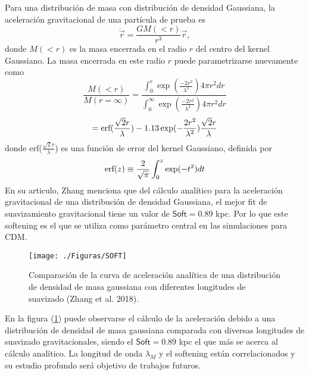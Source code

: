 \documentclass[a4paper,openright,12pt]{book}
\begin{document}
Para una distribución de masa con distribución de densidad Gaussiana, la aceleración gravitacional de una partícula de prueba es
\begin{equation}
\ddot{\vec{r}}= \frac{G M(<r)}{r^{3}}\vec{r},
\end{equation}
donde $M(<r)$ es la masa encerrada en el radio $r$ del centro del kernel Gaussiano. La masa encerrada en este radio $r$ puede parametrizarse nuevamente como
\begin{equation*}
\frac{M(<r)}{M(r=\infty)} = \frac{\int_{0}^{r}\exp(\frac{-2r^{2}}{\lambda^{2}})4\pi r^{2}dr}{\int_{0}^{\infty}\exp(\frac{-2r^{2}}{\lambda^{2}})4\pi r^{2}dr}
\end{equation*}
\begin{equation}
= \textup{erf}(\frac{\sqrt{2}r}{\lambda}) -1.13\exp(-\frac{2r^{2}}{\lambda^{2}})\frac{\sqrt{2}r}{\lambda}
\end{equation}
donde erf($\frac{\sqrt{2}r}{\lambda}$) es una función de error del kernel Gaussiano, definida por
\begin{equation*}
\textup{erf}(z) \equiv \frac{2}{\sqrt{\pi}}\int_{0}^{z}\exp(-t^{2})dt
\end{equation*}
En su articulo, Zhang menciona que del cálculo analítico para la aceleración gravitacional de una distribución de densidad Gaussiana, el mejor fit de suavizamiento gravitacional tiene un valor de $\textsf{Soft}=0.89$ kpc. Por lo que este softening es el que se utiliza como parámetro central en las simulaciones para CDM.


\begin{figure}
\centering
\texttt{[image: ./Figuras/SOFT]}
\caption{\footnotesize{Comparación de la curva de aceleración analítica de una distribución de densidad de masa gaussiana con diferentes longitudes de suavizado (Zhang et al. 2018).}}\label{fig 4.4}
\end{figure}

En la figura (\ref{fig 4.4}) puede observarse el cálculo de la aceleración debido a una distribución de densidad de masa gaussiana comparada con diversas longitudes de suavizado gravitacionales, siendo el $\textsf{Soft}=0.89$ kpc el que más se acerca al cálculo analítico. La longitud de onda $\lambda_{M}$ y el \textsf{softening} están correlacionados y su estudio profundo será objetivo de trabajos futuros.

\begin{figure}
\end{figure}
\end{document}
